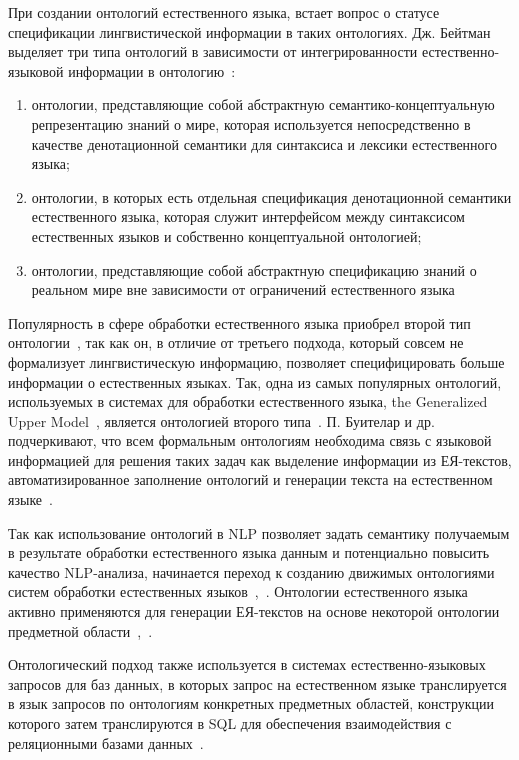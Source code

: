 При создании онтологий естественного языка, встает вопрос о статусе спецификации лингвистической информации в таких онтологиях. Дж. Бейтман выделяет три типа онтологий в зависимости от интегрированности естественно-языковой информации в онтологию~\cite{Bateman_1997}:
\begin{enumerate}
    \item онтологии, представляющие собой абстрактную семантико-концептуальную репрезентацию знаний о мире, которая используется непосредственно в качестве денотационной семантики для синтаксиса и лексики естественного языка;
    \item онтологии, в которых есть отдельная спецификация денотационной семантики естественного языка, которая служит интерфейсом между синтаксисом естественных языков и собственно концептуальной онтологией;
    \item онтологии, представляющие собой абстрактную спецификацию знаний о реальном мире вне зависимости от ограничений естественного языка
\end{enumerate}

Популярность в сфере обработки естественного языка приобрел второй тип онтологии~\cite[p.~8]{Bateman_1997}, так как он, в отличие от третьего подхода, который совсем не формализует лингвистическую информацию, позволяет специфицировать больше информации о естественных языках. Так, одна из самых популярных онтологий, используемых в системах для обработки естественного языка, the Generalized Upper Model~\cite{Bateman2002TheGU}, является онтологией второго типа~\cite{Bateman_1997}.
П. Буителар и др. подчеркивают, что всем формальным онтологиям необходима связь с языковой информацией для решения таких задач как выделение информации из ЕЯ-текстов, автоматизированное заполнение онтологий и генерации текста на естественном языке~\cite{Buitelaar_2009}.

Так как использование онтологий в NLP позволяет задать семантику получаемым в результате обработки естественного языка данным и потенциально повысить качество NLP-анализа, начинается переход к созданию движимых онтологиями систем обработки естественных языков~\cite{Kostareva2016UsingOM},~\cite{nevzorova_2019}.
Онтологии естественного языка активно применяются для генерации ЕЯ-текстов на основе некоторой онтологии предметной области~\cite{cimiano-etal-2013-exploiting},~\cite{Bouayad_2014}.

Онтологический подход также используется в системах естественно-языковых запросов для баз данных, в которых запрос на естественном языке транслируется в язык запросов по онтологиям конкретных предметных областей, конструкции которого затем транслируются в SQL для обеспечения взаимодействия с реляционными базами данных~\cite{saha_2016}.

